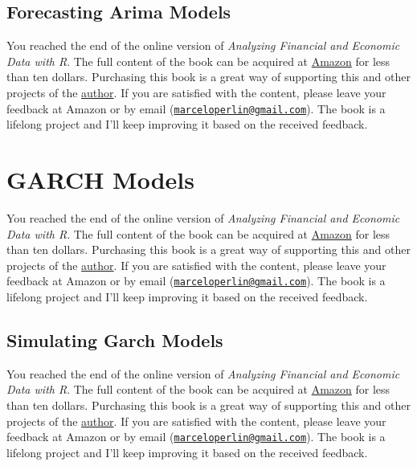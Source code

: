 \documentclass[
  12pt,
]{book}
\newenvironment{pleasebuyit}
{\begin{noteblock}
		
	} {\end{noteblock}}
\begin{document}
\hypertarget{forecasting-arima-models}{%
\subsection{Forecasting Arima Models}\label{forecasting-arima-models}}

\begin{pleasebuyit}
You reached the end of the online version of \emph{Analyzing Financial
and Economic Data with R}. The full content of the book can be acquired
at \href{https://www.amazon.com/dp/B084LSNXMN}{Amazon} for less than ten
dollars. Purchasing this book is a great way of supporting this and
other projects of the \href{https://www.msperlin.com/blog/}{author}. If
you are satisfied with the content, please leave your feedback at Amazon
or by email
(\href{mailto:marceloperlin@gmail.com}{\nolinkurl{marceloperlin@gmail.com}}).
The book is a lifelong project and I'll keep improving it based on the
received feedback.
\end{pleasebuyit}

\hypertarget{garch-models}{%
\section{GARCH Models}\label{garch-models}}

\begin{pleasebuyit}
You reached the end of the online version of \emph{Analyzing Financial
and Economic Data with R}. The full content of the book can be acquired
at \href{https://www.amazon.com/dp/B084LSNXMN}{Amazon} for less than ten
dollars. Purchasing this book is a great way of supporting this and
other projects of the \href{https://www.msperlin.com/blog/}{author}. If
you are satisfied with the content, please leave your feedback at Amazon
or by email
(\href{mailto:marceloperlin@gmail.com}{\nolinkurl{marceloperlin@gmail.com}}).
The book is a lifelong project and I'll keep improving it based on the
received feedback.
\end{pleasebuyit}

\hypertarget{simulating-garch-models}{%
\subsection{Simulating Garch Models}\label{simulating-garch-models}}

\begin{pleasebuyit}
You reached the end of the online version of \emph{Analyzing Financial
and Economic Data with R}. The full content of the book can be acquired
at \href{https://www.amazon.com/dp/B084LSNXMN}{Amazon} for less than ten
dollars. Purchasing this book is a great way of supporting this and
other projects of the \href{https://www.msperlin.com/blog/}{author}. If
you are satisfied with the content, please leave your feedback at Amazon
or by email
(\href{mailto:marceloperlin@gmail.com}{\nolinkurl{marceloperlin@gmail.com}}).
The book is a lifelong project and I'll keep improving it based on the
received feedback.
\end{pleasebuyit}
\end{document}
